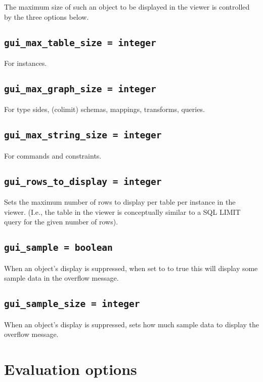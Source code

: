 \documentclass[10pt]{book}
\begin{document}
The maximum size of such an object to be displayed in the viewer is controlled by the three options below.

\subsection{{\tt gui\_max\_table\_size = integer}}

For instances.

\subsection{{\tt gui\_max\_graph\_size = integer}}

For type sides, (colimit) schemas, mappings, transforms, queries.

\subsection{{\tt gui\_max\_string\_size = integer}}

For commands and constraints.

\subsection{{\tt gui\_rows\_to\_display = integer}}

Sets the maximum number of rows to display per table per instance in the viewer.  (I.e., the table in the viewer is conceptually similar to a SQL LIMIT query for the given number of rows).

\subsection{{\tt gui\_sample = boolean}}

When an object's display is suppressed, when set to to true this will display some sample data in the overflow message.

\subsection{{\tt gui\_sample\_size = integer}}

When an object's display is suppressed, sets how much sample data to display the overflow message.

\section{Evaluation options}
\end{document}
